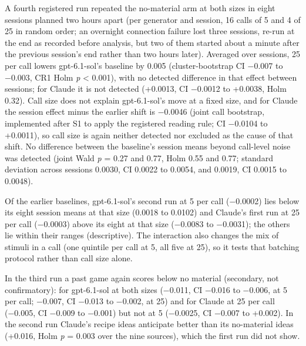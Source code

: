 \documentclass[
  10pt,
]{article}
\begin{document}
A fourth registered run repeated the
no-material arm at both sizes in eight
sessions planned two hours apart (per
generator and session, 16 calls of 5 and
4 of 25 in random order; an overnight
connection failure lost three sessions,
re-run at the end as recorded before
analysis, but two of them started about
a minute after the previous session's
end rather than two hours later).
Averaged over sessions, 25 per call
lowers gpt-6.1-sol's baseline by 0.005
(cluster-bootstrap CI −0.007 to −0.003,
CR1 Holm \emph{p} \textless{} 0.001),
with no detected difference in that
effect between sessions; for Claude it
is not detected (+0.0013, CI −0.0012 to
+0.0038, Holm 0.32). Call size does not
explain gpt-6.1-sol's move at a fixed
size, and for Claude the session effect
minus the earlier shift is −0.0046
(joint call bootstrap, implemented after
S1 to apply the registered reading rule;
CI −0.0104 to +0.0011), so call size is
again neither detected nor excluded as
the cause of that shift. No difference
between the baseline's session means
beyond call-level noise was detected
(joint Wald \emph{p} = 0.27 and 0.77,
Holm 0.55 and 0.77; standard deviation
across sessions 0.0030, CI 0.0022 to
0.0054, and 0.0019, CI 0.0015 to
0.0048).

Of the earlier baselines, gpt-6.1-sol's
second run at 5 per call (−0.0002) lies
below its eight session means at that
size (0.0018 to 0.0102) and Claude's
first run at 25 per call (−0.0003) above
its eight at that size (−0.0083 to
−0.0031); the others lie within their
ranges (descriptive). The interaction
also changes the mix of stimuli in a
call (one quintile per call at 5, all
five at 25), so it tests that batching
protocol rather than call size alone.

In the third run a past game again
scores below no material (secondary, not
confirmatory): for gpt-6.1-sol at both
sizes (−0.011, CI −0.016 to −0.006, at 5
per call; −0.007, CI −0.013 to −0.002,
at 25) and for Claude at 25 per call
(−0.005, CI −0.009 to −0.001) but not at
5 (−0.0025, CI −0.007 to +0.002). In the
second run Claude's recipe ideas
anticipate better than its no-material
ideas (+0.016, Holm \emph{p} = 0.003
over the nine sources), which the first
run did not show.
\end{document}
